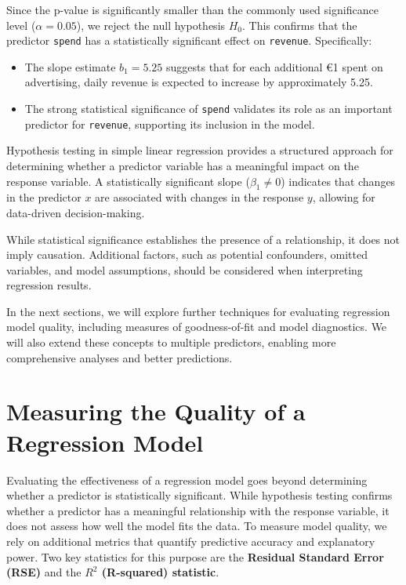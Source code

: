 \documentclass[
  11pt,
]{book}
\providecommand{\tightlist}{%
  \setlength{\itemsep}{0pt}\setlength{\parskip}{0pt}}
\theoremstyle{definition}
\theoremstyle{definition}
\theoremstyle{definition}
\theoremstyle{definition}
\theoremstyle{remark}
\begin{document}
Since the p-value is significantly smaller than the commonly used significance level (\(\alpha = 0.05\)), we reject the null hypothesis \(H_0\). This confirms that the predictor \texttt{spend} has a statistically significant effect on \texttt{revenue}. Specifically:

\begin{itemize}
\tightlist
\item
  The slope estimate \(b_1 = 5.25\) suggests that for each additional €1 spent on advertising, daily revenue is expected to increase by approximately 5.25.\\
\item
  The strong statistical significance of \texttt{spend} validates its role as an important predictor for \texttt{revenue}, supporting its inclusion in the model.
\end{itemize}

Hypothesis testing in simple linear regression provides a structured approach for determining whether a predictor variable has a meaningful impact on the response variable. A statistically significant slope (\(\beta_1 \neq 0\)) indicates that changes in the predictor \(x\) are associated with changes in the response \(y\), allowing for data-driven decision-making.

While statistical significance establishes the presence of a relationship, it does not imply causation. Additional factors, such as potential confounders, omitted variables, and model assumptions, should be considered when interpreting regression results.

In the next sections, we will explore further techniques for evaluating regression model quality, including measures of goodness-of-fit and model diagnostics. We will also extend these concepts to multiple predictors, enabling more comprehensive analyses and better predictions.

\section*{Measuring the Quality of a Regression Model}\label{measuring-the-quality-of-a-regression-model}


Evaluating the effectiveness of a regression model goes beyond determining whether a predictor is statistically significant. While hypothesis testing confirms whether a predictor has a meaningful relationship with the response variable, it does not assess how well the model fits the data. To measure model quality, we rely on additional metrics that quantify predictive accuracy and explanatory power. Two key statistics for this purpose are the \textbf{Residual Standard Error (RSE)} and the \textbf{\(R^2\) (R-squared) statistic}.
\end{document}
